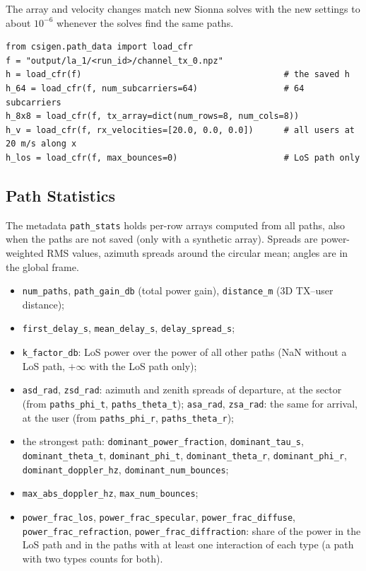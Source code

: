 \documentclass{article}
\begin{document}
The array and velocity changes match new Sionna solves with the new settings to about $10^{-6}$ whenever the solves find the same paths.
\begin{verbatim}
from csigen.path_data import load_cfr
f = "output/la_1/<run_id>/channel_tx_0.npz"
h = load_cfr(f)                                        # the saved h
h_64 = load_cfr(f, num_subcarriers=64)                 # 64 subcarriers
h_8x8 = load_cfr(f, tx_array=dict(num_rows=8, num_cols=8))
h_v = load_cfr(f, rx_velocities=[20.0, 0.0, 0.0])      # all users at 20 m/s along x
h_los = load_cfr(f, max_bounces=0)                     # LoS path only
\end{verbatim}

\subsection{Path Statistics}
\label{sec:stats}
The metadata \texttt{path\_stats} holds per-row arrays computed from all paths, also when the paths are not saved (only with a synthetic array). Spreads are power-weighted RMS values, azimuth spreads around the circular mean; angles are in the global frame.
\begin{itemize}
  \item \texttt{num\_paths}, \texttt{path\_gain\_db} (total power gain), \texttt{distance\_m} (3D TX--user distance);
  \item \texttt{first\_delay\_s}, \texttt{mean\_delay\_s}, \texttt{delay\_spread\_s};
  \item \texttt{k\_factor\_db}: LoS power over the power of all other paths (NaN without a LoS path, $+\infty$ with the LoS path only);
  \item \texttt{asd\_rad}, \texttt{zsd\_rad}: azimuth and zenith spreads of departure, at the sector (from \texttt{paths\_phi\_t}, \texttt{paths\_theta\_t}); \texttt{asa\_rad}, \texttt{zsa\_rad}: the same for arrival, at the user (from \texttt{paths\_phi\_r}, \texttt{paths\_theta\_r});
  \item the strongest path: \texttt{dominant\_power\_fraction}, \texttt{dominant\_tau\_s}, \texttt{dominant\_theta\_t}, \texttt{dominant\_phi\_t}, \texttt{dominant\_theta\_r}, \texttt{dominant\_phi\_r}, \texttt{dominant\_doppler\_hz}, \texttt{dominant\_num\_bounces};
  \item \texttt{max\_abs\_doppler\_hz}, \texttt{max\_num\_bounces};
  \item \texttt{power\_frac\_los}, \texttt{power\_frac\_specular}, \texttt{power\_frac\_diffuse}, \texttt{power\_frac\_refraction}, \texttt{power\_frac\_diffraction}: share of the power in the LoS path and in the paths with at least one interaction of each type (a path with two types counts for both).
\end{itemize}
\end{document}
